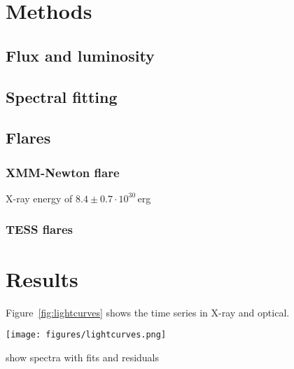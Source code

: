 \documentclass[twocolumn]{aastex631}
\begin{document}
\section{Methods}
\label{sec:methods}

\subsection{Flux and luminosity}

\subsection{Spectral fitting}

\subsection{Flares}

\subsubsection{XMM-Newton flare}

X-ray energy of $8.4\pm0.7\cdot10^{30}\,$erg

\subsubsection{TESS flares}

\section{Results}

Figure~\ref{fig:lightcurves} shows the time series in X-ray and optical. 

\begin{figure*}[ht!]
    \begin{centering}
        \texttt{[image: figures/lightcurves.png]}
        \caption{
         Top panel: Optical Monitoring (OM) light curve. Bottom panel: X-ray (PN, MOS1 and MOS2 combined) light curve. 
        }
        \label{fig:lightcurves}
    \end{centering}
\end{figure*}


show spectra with fits and residuals

\end{document}
